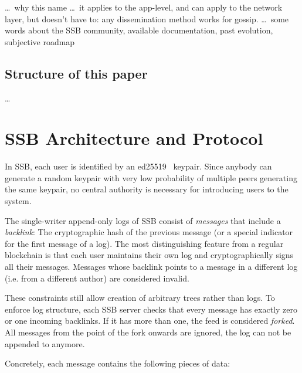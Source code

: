 \documentclass[sigconf]{acmart}
\begin{document}
\ldots\ why this name
\ldots\ it applies to the app-level, and can apply to the network layer, but doesn't have to: any dissemination method works for gossip.
\ldots\ some words about the SSB community, available documentation, past evolution, subjective roadmap \cite{ssb-consortium, tarr:ssb-notes,ssb-on-web,ssb-protocol-guide-2018,staltz-roadmap-2019}

\subsection*{Structure of this paper}

\ldots


\section{SSB Architecture and Protocol}

In SSB, each user is identified by an ed25519~\cite{bernstein2012high} keypair. Since anybody can generate a random keypair with very low probability of multiple peers generating the same keypair, no central authority is necessary for introducing users to the system.

The single-writer append-only logs of SSB consist of {\em messages} that include a {\em backlink}: The cryptographic hash of the previous message (or a special indicator for the first message of a log). The most distinguishing feature from a regular blockchain is that each user maintains their own log and cryptographically signs all their messages. Messages whose backlink points to a message in a different log (i.e. from a different author) are considered invalid.

These constraints still allow creation of arbitrary trees rather than logs. To enforce log structure, each SSB server checks that every message has exactly zero or one incoming backlinks. If it has more than one, the feed is considered {\em forked}. All messages from the point of the fork onwards are ignored, the log can not be appended to anymore.

Concretely, each message contains the following pieces of data:
\end{document}
